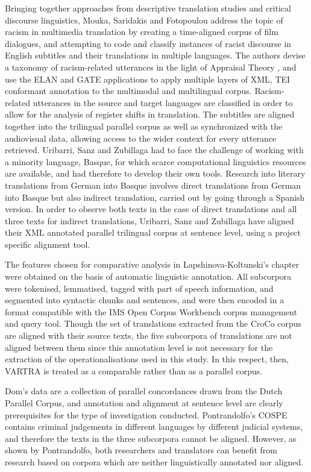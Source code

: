 \begin{refsection}
Bringing together approaches from descriptive translation studies and critical discourse linguistics, Mouka, Saridakis and Fotopoulou address the topic of racism in multimedia translation by creating a time-aligned corpus of film dialogues, and attempting to code and classify instances of racist discourse in English subtitles and their translations in multiple languages. The authors devise a taxonomy of racism-related utterances in the light of Appraisal Theory \citep{MartinWhite2005}, and use the ELAN and GATE applications to apply multiple layers of XML, TEI conformant annotation to the multimodal and multilingual corpus. Racism-related utterances in the source and target languages are classified in order to allow for the analysis of register shifts in translation. The subtitles are aligned together into the trilingual parallel corpus as well as synchronized with the audiovisual data, allowing access to the wider context for every utterance retrieved. 
Uribarri, Sanz and Zubillaga had to face the challenge of working with a minority language, Basque, for which scarce computational linguistics resources are available, and had therefore to develop their own tools. Research into literary translations from German into Basque involves direct translations from German into Basque but also indirect translation, carried out by going through a Spanish version. In order to observe both texts in the case of direct translations and all three texts for indirect translations, Uribarri, Sanz and Zubillaga have aligned their XML annotated parallel trilingual corpus at sentence level, using a project specific alignment tool.

The features chosen for comparative analysis in Lapshinova-Koltunski’s chapter were obtained on the basis of automatic linguistic annotation. All subcorpora were tokenised, lemmatised, tagged with part of speech information, and segmented into syntactic chunks and sentences, and were then encoded in a format compatible with the IMS Open Corpus Workbench corpus management and query tool. Though the set of translations extracted from the CroCo corpus are aligned with their source texts, the five subcorpora of translations are not aligned between them since this annotation level is not necessary for the extraction of the operationalisations used in this study. In this respect, then, VARTRA is treated as a comparable rather than as a parallel corpus.

Dom’s data are a collection of parallel concordances drawn from the Dutch Parallel Corpus, and annotation and alignment at sentence level are clearly prerequisites for the type of investigation conducted. Pontrandolfo’s COSPE contains criminal judgements in different languages by different judicial systems, and therefore the texts in the three subcorpora cannot be aligned. However, as shown by Pontrandolfo, both researchers and translators can benefit from research based on corpora which are neither linguistically annotated nor aligned. 


\end{refsection}
